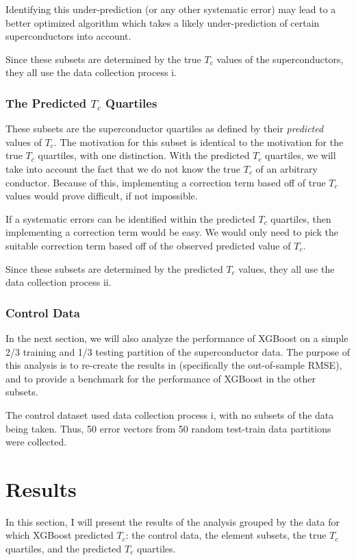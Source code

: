 \documentclass[oneside,12pt]{amsart}
\begin{document}
 Identifying this under-prediction (or any other systematic error) may lead to a better optimized algorithm which takes a likely under-prediction of certain superconductors into account.
 
 Since these subsets are determined by the true $T_c$ values of the superconductors, they all use the data collection process i.
 
 \subsubsection{The Predicted $T_c$ Quartiles}
 These subsets are the superconductor quartiles as defined by their \textit{predicted} values of $T_c$. The motivation for this subset is identical to the motivation for the true $T_c$ quartiles, with one distinction. With the predicted $T_c$ quartiles, we will take into account the fact that we do not know the true $T_c$ of an arbitrary conductor. Because of this, implementing a correction term based off of true $T_c$ values would prove difficult, if not impossible.
 
 If a systematic errors can be identified within the predicted $T_c$ quartiles, then implementing a correction term would be easy. We would only need to pick the suitable correction term based off of the observed predicted value of $T_c$.
 
 Since these subsets are determined by the predicted $T_c$ values, they all use the data collection process ii.
 
 \subsubsection{Control Data} In the next section, we will also analyze the performance of XGBoost on a simple 2/3 training and 1/3 testing partition of the superconductor data. The purpose of this analysis is to re-create the results in \cite{hamidieh_data-driven_2018} (specifically the out-of-sample RMSE), and to provide a benchmark for the performance of XGBoost in the other subsets.
 
 The control dataset used data collection process i, with no subsets of the data being taken. Thus, 50 error vectors from 50 random test-train data partitions were collected.
 \section{Results}
 
 In this section, I will present the results of the analysis grouped by the data for which XGBoost predicted $T_c$: the control data, the element subsets, the true $T_c$ quartiles, and the predicted $T_c$ quartiles.
 
\end{document}
